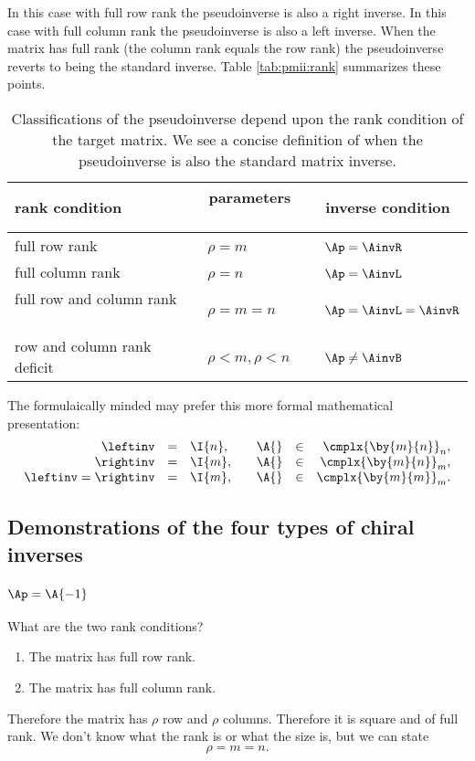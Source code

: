 In this case with full row rank the pseudoinverse is also a right inverse. In this case with full column rank the pseudoinverse is also a left inverse. When the matrix has full rank (the column rank equals the row rank) the pseudoinverse reverts to being the standard inverse. Table \eqref{tab:pmii:rank} summarizes these points.
\begin{table}[bottom]
\begin{center}
\begin{tabular}{lll}
rank condition   & \ parameters \ & \ inverse condition\\\hline\hline
full row rank    & \ $\rho = m $  & \ $\Ap = \AinvR$ \\[3pt]
full column rank & \ $\rho = n $  & \ $\Ap = \AinvL$ \\[3pt]\hline
full row and column rank \ & \ $\rho = m = n $ \ & \ $\Ap = \AinvL = \AinvR$\\  row and column rank deficit \ & \ $\rho < m, \rho < n $ \ & \ $\Ap \ne \AinvB$ \\[6pt]
\end{tabular}
\end{center}
\label{tab:pmii:rank}
\caption[Classifications of the pseudoinverse]{Classifications of the pseudoinverse depend upon the rank condition of the target matrix. We see a concise definition of when the pseudoinverse is also the standard matrix inverse.}
\end{table}%

The formulaically minded may prefer this more formal mathematical presentation:
\begin{equation}
  \begin{array}{rclrcr}
    \leftinv &=& \I{n}, & \quad \A{}&\in&\cmplx{\by{m}{n}}_{n},\\
    \rightinv &=& \I{m}, & \quad \A{}&\in&\cmplx{\by{m}{n}}_{m},\\
    \leftinv = \rightinv &=& \I{m}, & \quad \A{}&\in&\cmplx{\by{m}{m}}_{m}.\\
  \end{array}
\end{equation}

\subsection{Demonstrations of the four types of chiral inverses}

\subsubsection{$\Ap=\A{-1}$}
What are the two rank conditions?
\begin{enumerate}
\item The matrix has full row rank.
\item The matrix has full column rank.
\end{enumerate}
Therefore the matrix has $\rho$ row and $\rho$ columns. Therefore it is square and of full rank. We don't know what the rank is or what the size is, but we can state
\begin{equation}
  \rho = m = n.
\end{equation}

